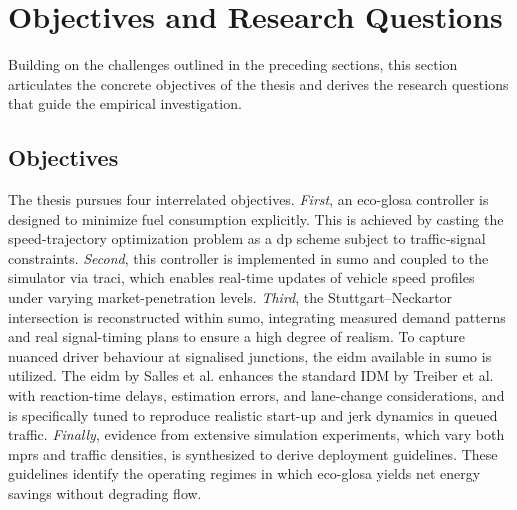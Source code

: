 \section{Objectives and Research Questions}
\label{sec:Objectives_and_Research_Questions}

Building on the challenges outlined in the preceding sections, this section articulates the concrete objectives of the thesis and derives the research questions that guide the empirical investigation.

\subsection{Objectives}
\label{subsec:Objectives}
The thesis pursues four interrelated objectives. 
\emph{First}, an \ac{eco-glosa} controller is designed to minimize fuel consumption explicitly. This is achieved by casting the speed-trajectory optimization problem as a \ac{dp} scheme subject to traffic-signal constraints. 
\emph{Second}, this controller is implemented in \ac{sumo} and coupled to the simulator via \ac{traci}, which enables real-time updates of vehicle speed profiles under varying market-penetration levels. 
\emph{Third}, the Stuttgart–Neckartor intersection is reconstructed within \ac{sumo}, integrating measured demand patterns and real signal-timing plans to ensure a high degree of realism. To capture nuanced driver behaviour at signalised junctions, the \ac{eidm} available in \ac{sumo} is utilized. The \ac{eidm} by Salles et al. enhances the standard IDM by Treiber et al. \cite{Treiber_2000} with reaction-time delays, estimation errors, and lane-change considerations, and is specifically tuned to reproduce realistic start-up and jerk dynamics in queued traffic. \cite{Salles2022}
\emph{Finally}, evidence from extensive simulation experiments, which vary both \acp{mpr} and traffic densities, is synthesized to derive deployment guidelines. These guidelines identify the operating regimes in which \ac{eco-glosa} yields net energy savings without degrading flow.

